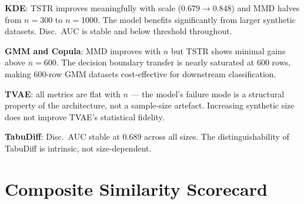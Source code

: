 \documentclass[12pt,a4paper]{article}
\begin{document}
\begin{tcolorbox}[insightbox, title={Key Sensitivity Findings}]
\textbf{KDE}: TSTR improves meaningfully with scale ($0.679 \to 0.848$) and MMD halves from $n=300$ to $n=1000$. The model benefits significantly from larger synthetic datasets. Disc.\ AUC is stable and below threshold throughout.

\medskip
\textbf{GMM and Copula}: MMD improves with $n$ but TSTR shows minimal gains above $n=600$. The decision boundary transfer is nearly saturated at 600 rows, making 600-row GMM datasets cost-effective for downstream classification.

\medskip
\textbf{TVAE}: all metrics are flat with $n$ --- the model's failure mode is a structural property of the architecture, not a sample-size artefact. Increasing synthetic size does not improve TVAE's statistical fidelity.

\medskip
\textbf{TabuDiff}: Disc.\ AUC stable at 0.689 across all sizes. The distinguishability of TabuDiff is intrinsic, not size-dependent.
\end{tcolorbox}

\section{Composite Similarity Scorecard}
\end{document}
